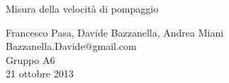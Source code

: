 \begin{center}

	\vspace{0.5cm}
     	{\huge Misura della velocità di pompaggio}
	\vspace{0.5cm}

      	{\large Francesco Pasa, Davide Bazzanella, Andrea Miani} \\
      	{Bazzanella.Davide@gmail.com} \\
		{\large Gruppo A6} \\
	
	\vspace{0.3cm}
      	{\large 21 ottobre 2013}
    
    \vspace{0.7cm}

\end{center}
